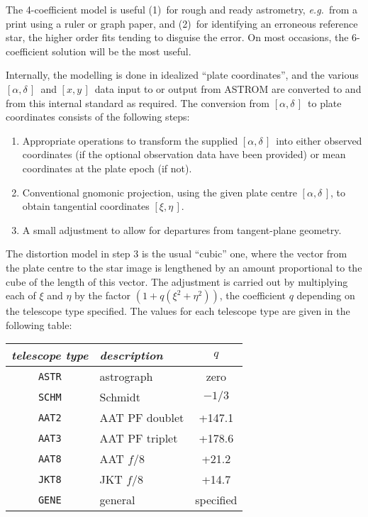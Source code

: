 \documentclass[twoside,11pt]{article}
\renewcommand{\_}{\texttt{\symbol{95}}}
\newcommand{\radec}     {$[\alpha,\delta\,]$}
\newcommand{\xy}        {$[x,y\,]$}
\newcommand{\xieta}     {$[\xi,\eta\,]$}
\begin{document}
The 4-coefficient model is useful (1)~for rough and ready astrometry,
\textit{e.g.}\ from a print using a ruler or graph paper, and (2)~for
identifying an erroneous reference star, the higher order fits tending
to disguise the error.  On most occasions, the 6-coefficient solution
will be the most useful.

Internally, the modelling is done in idealized ``plate coordinates'',
and the various \radec\ and \xy\ data input to or output from ASTROM are
converted to and from this internal standard as required.  The conversion
from \radec\ to plate coordinates consists of the following steps:

\begin{enumerate}

\item Appropriate operations to transform the supplied \radec\ into either
observed coordinates (if the optional observation data have been provided)
or mean coordinates at the plate epoch (if not).

\item Conventional gnomonic projection, using the given plate centre
\radec, to obtain tangential coordinates \xieta.

\item A small adjustment to allow for departures from tangent-plane
geometry.

\end{enumerate}

The distortion model in step 3 is the usual ``cubic'' one, where the
vector from the plate centre to the star image is lengthened by an amount
proportional to the cube of the length of this vector.  The adjustment is
carried out by multiplying each of $\xi$ and $\eta$ by the factor $(1 +
q (\xi^{2}+\eta^{2}))$, the coefficient $q$ depending on the telescope
type specified.  The values for each telescope type are given in the
following table:

\goodbreak
\begin{center}
\begin{tabular}{|c|l|c|}
\hline
\textit{telescope type} & \textit{description} & $q$ \\
\hline
\texttt{ASTR} & astrograph & zero \\
\texttt{SCHM} & Schmidt & $-1/3$ \\
\texttt{AAT2} & AAT PF doublet & +147.1 \\
\texttt{AAT3} & AAT PF triplet & +178.6 \\
\texttt{AAT8} & AAT $f/8$ & +21.2 \\
\texttt{JKT8} & JKT $f/8$ & +14.7 \\
\texttt{GENE} & general & specified \\
\hline
\end{tabular}
\end{center}
\end{document}
